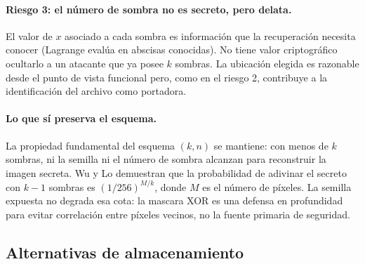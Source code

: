 \documentclass[11pt,a4paper]{article}
\begin{document}
\paragraph{Riesgo 3: el número de sombra no es secreto, pero delata.}
El valor de $x$ asociado a cada sombra es información que la recuperación
necesita conocer (Lagrange evalúa en abscisas conocidas). No tiene valor
criptográfico ocultarlo a un atacante que ya posee $k$ sombras. La
ubicación elegida es razonable desde el punto de vista funcional pero,
como en el riesgo 2, contribuye a la identificación del archivo como
portadora.

\paragraph{Lo que sí preserva el esquema.}
La propiedad fundamental del esquema $(k,n)$ se mantiene: con menos de $k$
sombras, ni la semilla ni el número de sombra alcanzan para reconstruir la
imagen secreta. Wu y Lo demuestran que la probabilidad de adivinar el
secreto con $k{-}1$ sombras es $(1/256)^{M/k}$, donde $M$ es el número de
píxeles. La semilla expuesta no degrada esa cota: la mascara XOR es una
defensa en profundidad para evitar correlación entre píxeles vecinos, no la
fuente primaria de seguridad.

\subsection*{Alternativas de almacenamiento}
\end{document}
